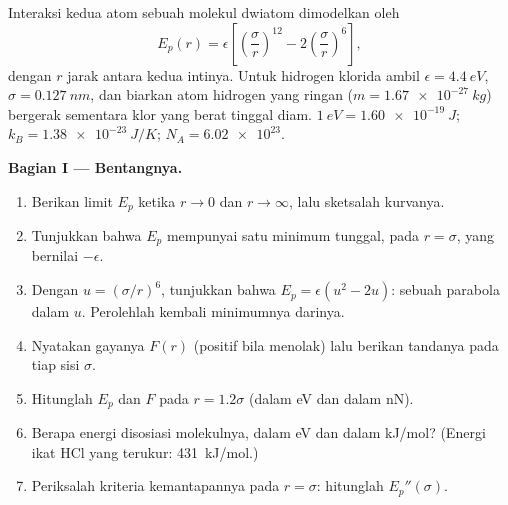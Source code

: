 \begin{problem}
\label{pb:b1:work-and-energy:1}
Interaksi kedua atom sebuah molekul dwiatom dimodelkan oleh 
\[
E_p(r) = \epsilon\left[\left(\frac{\sigma}{r}\right)^{12} - 2\left(\frac{\sigma}{r}\right)^{6}\right],
\]
dengan $r$ jarak antara kedua intinya. Untuk hidrogen klorida ambil
$\epsilon = \qty{4.4}{eV}$, $\sigma = \qty{0.127}{nm}$, dan biarkan atom
hidrogen yang ringan ($m = \qty{1.67e-27}{kg}$) bergerak sementara klor
yang berat tinggal diam. $\qty{1}{eV} = \qty{1.60e-19}{J}$;
$k_B = \qty{1.38e-23}{J/K}$; $N_A = \num{6.02e23}$.

\medskip
\noindent\textbf{Bagian I --- Bentangnya.}
\begin{enumerate}
  \item Berikan limit $E_p$ ketika $r \to 0$ dan $r \to \infty$, lalu
        sketsalah kurvanya.
  \item Tunjukkan bahwa $E_p$ mempunyai satu minimum tunggal, pada
        $r = \sigma$, yang bernilai $-\epsilon$.
  \item Dengan $u = (\sigma/r)^6$, tunjukkan bahwa $E_p = \epsilon(u^2 - 2u)$:
        sebuah parabola dalam $u$. Perolehlah kembali minimumnya darinya.
  \item Nyatakan gayanya $F(r)$ (positif bila menolak) lalu berikan
        tandanya pada tiap sisi $\sigma$.
  \item Hitunglah $E_p$ dan $F$ pada $r = 1.2\sigma$ (dalam eV dan dalam nN).
  \item Berapa energi disosiasi molekulnya, dalam eV dan dalam
        \unit{kJ/mol}? (Energi ikat HCl yang terukur: \qty{431}{kJ/mol}.)
  \item Periksalah kriteria kemantapannya pada $r = \sigma$: hitunglah
        $E_p''(\sigma)$.
\end{enumerate}


\end{problem}
